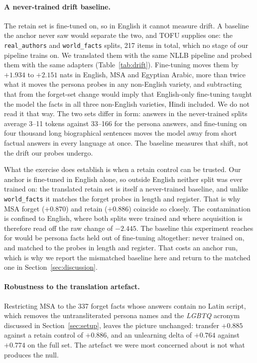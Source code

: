 \documentclass[11pt]{article}
\begin{document}
\paragraph{A never-trained drift baseline.}
The retain set is fine-tuned on, so in English it cannot measure drift. A
baseline the anchor never saw would separate the two, and TOFU supplies one:
the \texttt{real\_authors} and \texttt{world\_facts} splits, 217 items in
total, which no stage of our pipeline trains on. We translated them with the
same NLLB pipeline and probed them with the same adapters
(Table~\ref{tab:drift}). Fine-tuning moves them by $+1.934$ to $+2.151$ nats
in English, MSA and Egyptian Arabic, more than twice what it moves the
persona probes in any non-English variety, and subtracting that from the
forget-set change would imply that English-only fine-tuning taught the model
the facts in all three non-English varieties, Hindi included. We do not read it that way. The two sets differ in form:
answers in the never-trained splits average 3--11 tokens against 33--166 for
the persona answers, and fine-tuning on four thousand long biographical
sentences moves the model away from short factual answers in every language
at once. The baseline measures that shift, not the drift our probes undergo.

What the exercise does establish is when a retain control can be trusted. Our
anchor is fine-tuned in English alone, so outside English neither split was
ever trained on: the translated retain set is itself a never-trained baseline,
and unlike \texttt{world\_facts} it matches the forget probes in length and
register. That is why MSA forget ($+0.870$) and retain ($+0.886$) coincide so
closely. The contamination is confined to English, where both splits were
trained and where acquisition is therefore read off the raw change of
$-2.445$. The baseline this experiment reaches for would be persona facts
held out of fine-tuning altogether: never trained on, and matched to the
probes in length and register. That costs an anchor run, which is why we
report the mismatched baseline here and return to the matched one in
Section~\ref{sec:discussion}.

\paragraph{Robustness to the translation artefact.}
Restricting MSA to the 337 forget facts whose answers contain no Latin
script, which removes the untransliterated persona names and the
\emph{LGBTQ} acronym discussed in Section~\ref{sec:setup}, leaves the picture
unchanged: transfer $+0.885$ against a retain control of $+0.886$, and an
unlearning delta of $+0.764$ against $+0.774$ on the full set. The artefact we were most concerned about is not what produces the
null.
\end{document}

